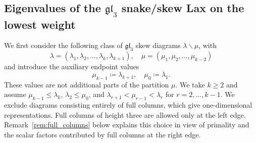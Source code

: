 \documentclass[12pt,reqno]{amsart}
\numberwithin{equation}{section}
\begin{document}
	\subsection{Eigenvalues of the \texorpdfstring{$\mathfrak{gl}_3$}{gl₃} snake/skew Lax on the lowest weight}
	We first consider the following class of $\mathfrak{gl}_3$ skew
	diagrams $\lambda\backslash\mu$, with
	\begin{equation}
		\lambda = (\lambda_1,\lambda_2,\dots,\lambda_k,\lambda_{k+1}),\quad \mu = (\mu_1,\mu_2,\dots,\mu_{k-2})\label{eqn:gl_3_skew_diag}
	\end{equation}
	and introduce the auxiliary endpoint values
	\begin{equation}
		\mu_{k-1}\coloneqq \lambda_{k+1},\quad \mu_0 \coloneqq \lambda_1.
	\end{equation}
	These values are not additional parts of the partition $\mu$.
	We take $k\geq2$ and assume $\mu_{k-1}\leq\lambda_k$,
	$\lambda_2\leq\mu_0$, and
	$\lambda_{r+1}<\mu_{r-1}<\lambda_r$ for $r=2,\ldots,k-1$.
	We exclude diagrams consisting entirely of full columns,
	which give one-dimensional representations.
	Full columns of height three are allowed only at the left edge.
	Remark~\ref{rem:full_columns} below explains this choice in view of
	primality and the scalar factors contributed by full columns
	at the right edge.
\end{document}
